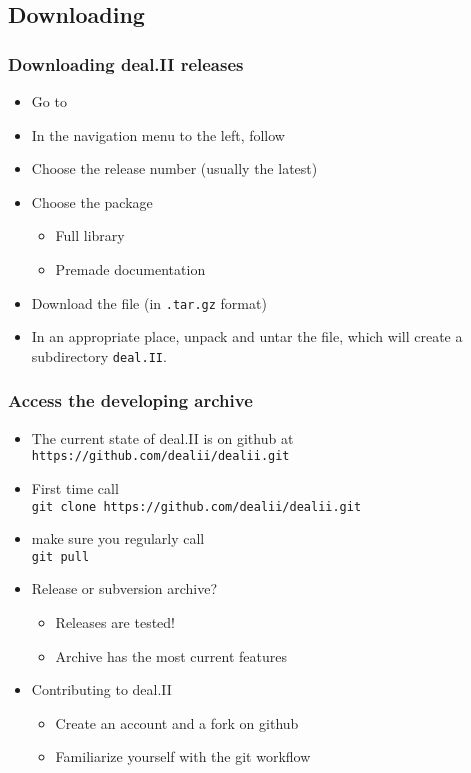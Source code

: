 \subsection{Downloading}

\begin{frame}
  \frametitle{Downloading deal.II releases}
  \begin{itemize}
  \item Go to \texttt{}
  \item In the navigation menu to the left, follow
  \item Choose the release number (usually the latest)
  \item Choose the package
    \begin{itemize}
    \item Full library
    \item Premade documentation
    \end{itemize}
  \item Download the file (in \texttt{.tar.gz} format)
  \item In an appropriate place, unpack and untar the file, which will
    create a subdirectory \texttt{deal.II}.
  \end{itemize}
\end{frame}

\begin{frame}
  \frametitle{Access the developing archive}
  \begin{itemize}
  \item The current state of deal.II is on github at\\
    \texttt{https://github.com/dealii/dealii.git}
  \item First time call\\
    \texttt{\footnotesize git clone https://github.com/dealii/dealii.git}
  \item make sure you regularly call\\
    \texttt{git pull}
  \item Release or subversion archive?
    \begin{itemize}
    \item Releases are tested!
    \item Archive has the most current features
    \end{itemize}
    \pause
    \item Contributing to deal.II
      \begin{itemize}
      \item Create an account and a fork on github
      \item Familiarize yourself with the git workflow
      \end{itemize}
  \end{itemize}
\end{frame}

